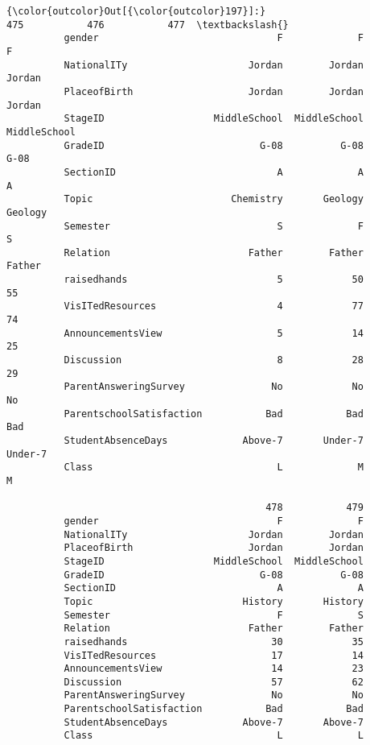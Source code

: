 \documentclass{article}
\begin{document}
            \begin{Verbatim}[commandchars=\\\{\}]
{\color{outcolor}Out[{\color{outcolor}197}]:}                                    475           476           477  \textbackslash{}
          gender                               F             F             F   
          NationalITy                     Jordan        Jordan        Jordan   
          PlaceofBirth                    Jordan        Jordan        Jordan   
          StageID                   MiddleSchool  MiddleSchool  MiddleSchool   
          GradeID                           G-08          G-08          G-08   
          SectionID                            A             A             A   
          Topic                        Chemistry       Geology       Geology   
          Semester                             S             F             S   
          Relation                        Father        Father        Father   
          raisedhands                          5            50            55   
          VisITedResources                     4            77            74   
          AnnouncementsView                    5            14            25   
          Discussion                           8            28            29   
          ParentAnsweringSurvey               No            No            No   
          ParentschoolSatisfaction           Bad           Bad           Bad   
          StudentAbsenceDays             Above-7       Under-7       Under-7   
          Class                                L             M             M   
          
                                             478           479  
          gender                               F             F  
          NationalITy                     Jordan        Jordan  
          PlaceofBirth                    Jordan        Jordan  
          StageID                   MiddleSchool  MiddleSchool  
          GradeID                           G-08          G-08  
          SectionID                            A             A  
          Topic                          History       History  
          Semester                             F             S  
          Relation                        Father        Father  
          raisedhands                         30            35  
          VisITedResources                    17            14  
          AnnouncementsView                   14            23  
          Discussion                          57            62  
          ParentAnsweringSurvey               No            No  
          ParentschoolSatisfaction           Bad           Bad  
          StudentAbsenceDays             Above-7       Above-7  
          Class                                L             L  
\end{Verbatim}
        
\end{document}
